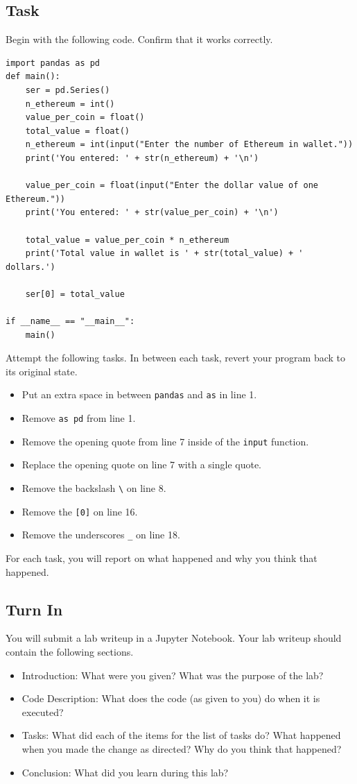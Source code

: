 \subsection*{Task}
Begin with the following code. Confirm that it works correctly.
\begin{lstlisting}[style=pippython]
import pandas as pd
def main():
    ser = pd.Series()
    n_ethereum = int()
    value_per_coin = float()
    total_value = float()
    n_ethereum = int(input("Enter the number of Ethereum in wallet."))
    print('You entered: ' + str(n_ethereum) + '\n')
    
    value_per_coin = float(input("Enter the dollar value of one Ethereum."))
    print('You entered: ' + str(value_per_coin) + '\n')
    
    total_value = value_per_coin * n_ethereum
    print('Total value in wallet is ' + str(total_value) + ' dollars.')
    
    ser[0] = total_value

if __name__ == "__main__":
    main()
\end{lstlisting}
Attempt the following tasks. In between each task, revert your program back to its original state.
\begin{itemize}
    \item Put an extra space in between \verb|pandas| and \verb|as| in line 1.
    \item Remove \verb|as pd| from line 1.
    \item Remove the opening quote from line 7 inside of the \verb|input| function.
    \item Replace the opening quote on line 7 with a single quote.
    \item Remove the backslash \verb|\| on line 8.
    \item Remove the \verb|[0]| on line 16.
    \item Remove the underscores \verb|_| on line 18.
\end{itemize}
For each task, you will report on what happened and why you think that happened.
\subsection*{Turn In}
You will submit a lab writeup in a Jupyter Notebook. Your lab writeup should contain the following sections.
\begin{itemize}
    \item Introduction: What were you given? What was the purpose of the lab?
    \item Code Description: What does the code (as given to you) do when it is executed?
    \item Tasks: What did each of the items for the list of tasks do? What happened when you made the change as directed? Why do you think that happened?
    \item Conclusion: What did you learn during this lab?
\end{itemize}

